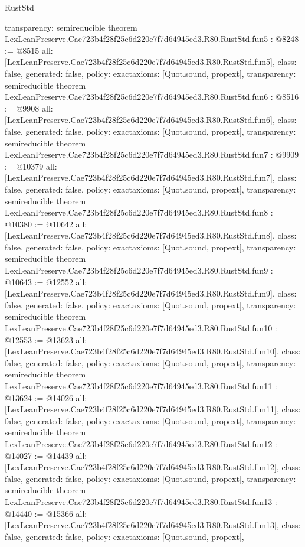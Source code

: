 \begin{lexlean}{RustStd}
\begin{coremodule}
{  transparency: semireducible
}
theorem LexLeanPreserve.Cae723b4f28f25c6d220e7f7d64945ed3.R80.RustStd.fun5 : @8248 := @8515 {
  all: [LexLeanPreserve.Cae723b4f28f25c6d220e7f7d64945ed3.R80.RustStd.fun5],
  class: false,
  generated: false,
  policy: exact{axioms: [Quot.sound, propext]},
  transparency: semireducible
}
theorem LexLeanPreserve.Cae723b4f28f25c6d220e7f7d64945ed3.R80.RustStd.fun6 : @8516 := @9908 {
  all: [LexLeanPreserve.Cae723b4f28f25c6d220e7f7d64945ed3.R80.RustStd.fun6],
  class: false,
  generated: false,
  policy: exact{axioms: [Quot.sound, propext]},
  transparency: semireducible
}
theorem LexLeanPreserve.Cae723b4f28f25c6d220e7f7d64945ed3.R80.RustStd.fun7 : @9909 := @10379 {
  all: [LexLeanPreserve.Cae723b4f28f25c6d220e7f7d64945ed3.R80.RustStd.fun7],
  class: false,
  generated: false,
  policy: exact{axioms: [Quot.sound, propext]},
  transparency: semireducible
}
theorem LexLeanPreserve.Cae723b4f28f25c6d220e7f7d64945ed3.R80.RustStd.fun8 : @10380 := @10642 {
  all: [LexLeanPreserve.Cae723b4f28f25c6d220e7f7d64945ed3.R80.RustStd.fun8],
  class: false,
  generated: false,
  policy: exact{axioms: [Quot.sound, propext]},
  transparency: semireducible
}
theorem LexLeanPreserve.Cae723b4f28f25c6d220e7f7d64945ed3.R80.RustStd.fun9 : @10643 := @12552 {
  all: [LexLeanPreserve.Cae723b4f28f25c6d220e7f7d64945ed3.R80.RustStd.fun9],
  class: false,
  generated: false,
  policy: exact{axioms: [Quot.sound, propext]},
  transparency: semireducible
}
theorem LexLeanPreserve.Cae723b4f28f25c6d220e7f7d64945ed3.R80.RustStd.fun10 : @12553 := @13623 {
  all: [LexLeanPreserve.Cae723b4f28f25c6d220e7f7d64945ed3.R80.RustStd.fun10],
  class: false,
  generated: false,
  policy: exact{axioms: [Quot.sound, propext]},
  transparency: semireducible
}
theorem LexLeanPreserve.Cae723b4f28f25c6d220e7f7d64945ed3.R80.RustStd.fun11 : @13624 := @14026 {
  all: [LexLeanPreserve.Cae723b4f28f25c6d220e7f7d64945ed3.R80.RustStd.fun11],
  class: false,
  generated: false,
  policy: exact{axioms: [Quot.sound, propext]},
  transparency: semireducible
}
theorem LexLeanPreserve.Cae723b4f28f25c6d220e7f7d64945ed3.R80.RustStd.fun12 : @14027 := @14439 {
  all: [LexLeanPreserve.Cae723b4f28f25c6d220e7f7d64945ed3.R80.RustStd.fun12],
  class: false,
  generated: false,
  policy: exact{axioms: [Quot.sound, propext]},
  transparency: semireducible
}
theorem LexLeanPreserve.Cae723b4f28f25c6d220e7f7d64945ed3.R80.RustStd.fun13 : @14440 := @15366 {
  all: [LexLeanPreserve.Cae723b4f28f25c6d220e7f7d64945ed3.R80.RustStd.fun13],
  class: false,
  generated: false,
  policy: exact{axioms: [Quot.sound, propext]},
}
\end{coremodule}
\end{lexlean}
